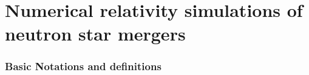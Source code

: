 \part{Numerical relativity simulations of neutron star mergers}



\section{Basic Notations and definitions}

